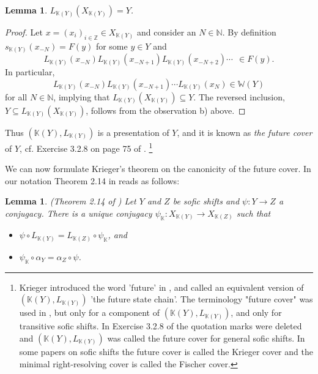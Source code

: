 \documentclass[12pt,oneside,english]{amsart}
\newtheorem{lemma}[thm]{Lemma}
\begin{document}
\begin{lemma}\label{04-09-25f} $L_{\mathbb K(Y)}(X_{\mathbb K(Y)}) =Y$.
\end{lemma}
\begin{proof} Let $x = (x_i)_{i \in \mathbb Z} \in X_{\mathbb K(Y)}$ and consider an $N \in \mathbb N$. By definition $s_{\mathbb K(Y)}(x_{-N}) = F(y)$ for some $y \in Y$ and
$$
L_{\mathbb K(Y)}(x_{-N})L_{\mathbb K(Y)}(x_{-N+1}) L_{\mathbb K(Y)}(x_{-N+2}) \cdots  \ \ \in F(y) .
$$
In particular,
$$
L_{\mathbb K(Y)}(x_{-N})L_{\mathbb K(Y)}(x_{-N+1}) \cdots L_{\mathbb K(Y)}(x_{N}) \in \mathbb W(Y)
$$
for all $N \in \mathbb N$, implying that $L_{\mathbb K(Y)}(X_{\mathbb K(Y)}) \subseteq Y$. The reversed inclusion, $Y \subseteq L_{\mathbb K(Y)}(X_{\mathbb K(Y)})$, follows from the observation b) above.
\end{proof}

Thus $(\mathbb K(Y),L_{\mathbb K(Y)})$ is a presentation of $Y$, and it is known as \emph{the future cover} of $Y$, cf. Exercise 3.2.8 on page 75 of \cite{LM}. \footnote{Krieger introduced the word 'future' in \cite{Kr1}, and called an equivalent version of $(\mathbb K(Y),L_{\mathbb K(Y)})$ 'the future state chain'. The terminology "future cover" was used in \cite{BKM}, but only for a component of $(\mathbb K(Y),L_{\mathbb K(Y)})$, and only for transitive sofic shifts. In Exercise 3.2.8 of \cite{LM} the quotation marks were deleted and $(\mathbb K(Y),L_{\mathbb K(Y)})$ was called the future cover for general sofic shifts. In some papers on sofic shifts the future cover is called the Krieger cover and the minimal right-resolving cover is called the Fischer cover.  }





We can now formulate Krieger's theorem on the canonicity of the future cover. In our notation Theorem 2.14 in \cite{Kr1} reads as follows: 

\begin{lemma}\label{03-02-25ax} (Theorem 2.14 of \cite{Kr1})  Let $Y$ and $Z$ be sofic shifts and $\psi : Y \to Z$ a conjugacy. There is a unique conjugacy $\psi_{\mathbb K} : X_{\mathbb K(Y)} \to X_{\mathbb K(Z)}$ such that
\begin{itemize}
\item[(a)] $\psi \circ L_{\mathbb K(Y)} = L_{\mathbb K(Z)} \circ \psi_{\mathbb K}$, and
\item[(b)] $\psi_{\mathbb K} \circ \alpha_Y = \alpha_{Z} \circ \psi$.
\end{itemize}
\end{lemma}
\end{document}
